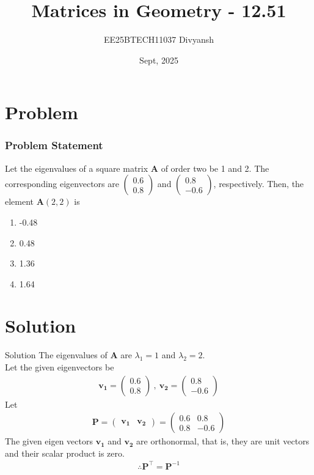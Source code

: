 \documentclass{beamer}
\title{Matrices in Geometry - 12.51}
\author{EE25BTECH11037  Divyansh}
\date{Sept, 2025}
\let\vec\mathbf
\providecommand{\brak}[1]{\ensuremath{\left(#1\right)}}
\theoremstyle{remark}
\newcommand{\myvec}[1]{\ensuremath{\begin{pmatrix}#1\end{pmatrix}}}
\begin{document}
    
    \maketitle
    
    
    \section{Problem}
    \begin{frame}
    \frametitle{Problem Statement}
    Let the eigenvalues of a square matrix $\vec{A}$ of order two be 1 and 2. The corresponding eigenvectors are $\myvec{0.6 \\ 0.8}$ and $\myvec{0.8 \\ -0.6}$, respectively. Then, the element $\vec{A}\brak{2, 2}$ is

    \begin{enumerate}[label=\alph*)]
        \item -0.48
        \item 0.48
        \item 1.36
        \item 1.64
    \end{enumerate}
  \end{frame}
    
    \section{Solution}
    \begin{frame}{Solution}
    The eigenvalues of $\vec{A}$ are $\lambda_1=1$ and $\lambda_2=2$.\\
Let the given eigenvectors be
\begin{align}
    \vec{v_1}=\myvec{0.6 \\ 0.8} \ , \ \vec{v_2}=\myvec{0.8 \\ -0.6}
\end{align}
Let
\begin{align}
    \vec{P}=\myvec{\vec{v_1} & \vec{v_2}}=\myvec{0.6 & 0.8 \\ 0.8 & -0.6}
\end{align}
The given eigen vectors $\vec{v_1}$ and $\vec{v_2}$ are orthonormal, that is, they are unit vectors and their scalar product is zero. 
\begin{align}
    \therefore \vec{P}^{\top} = \vec{P}^{-1}
\end{align}
    \end{frame}
    
\end{document}
